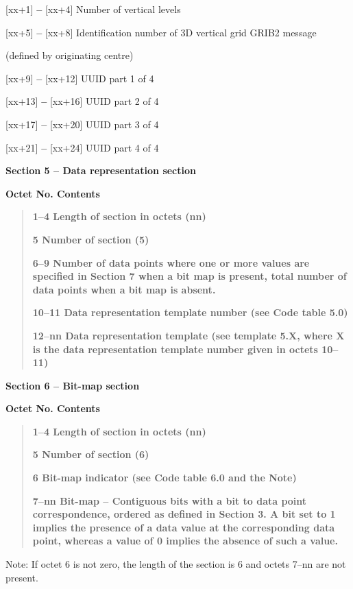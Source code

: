 {[}xx+1{]} \textbf{--} {[}xx+4{]} Number of vertical levels

{[}xx+5{]} \textbf{--} {[}xx+8{]} Identification number of 3D vertical grid GRIB2 message

(defined by originating centre)

{[}xx+9{]} \textbf{--} {[}xx+12{]} UUID part 1 of 4

{[}xx+13{]} \textbf{--} {[}xx+16{]} UUID part 2 of 4

{[}xx+17{]} \textbf{--} {[}xx+20{]} UUID part 3 of 4

{[}xx+21{]} \textbf{--} {[}xx+24{]} UUID part 4 of 4

\textbf{Section 5 -- Data representation section\\
}

\textbf{Octet No. Contents}

\begin{quote}
\textbf{1--4 Length of section in octets (nn)}

\textbf{5 Number of section (5)}

\textbf{6--9 Number of data points where one or more values are specified in Section 7 when a bit map is present, total number of data points when a bit map is absent.}

\textbf{10--11 Data representation template number (see Code table 5.0)}

\textbf{12--nn Data representation template (see template 5.X, where X is the data representation template number given in octets 10--11)}
\end{quote}

\textbf{Section 6 -- Bit-map section\\
}

\textbf{Octet No. Contents}

\begin{quote}
\textbf{1--4 Length of section in octets (nn)}

\textbf{5 Number of section (6)}

\textbf{6 Bit-map indicator (see Code table 6.0 and the Note)}

\textbf{7--nn Bit-map -- Contiguous bits with a bit to data point correspondence, ordered as defined in Section 3. A bit set to 1 implies the presence of a data value at the corresponding data point, whereas a value of 0 implies the absence of such a value.}
\end{quote}

Note: If octet 6 is not zero, the length of the section is 6 and octets 7--nn are not present.

